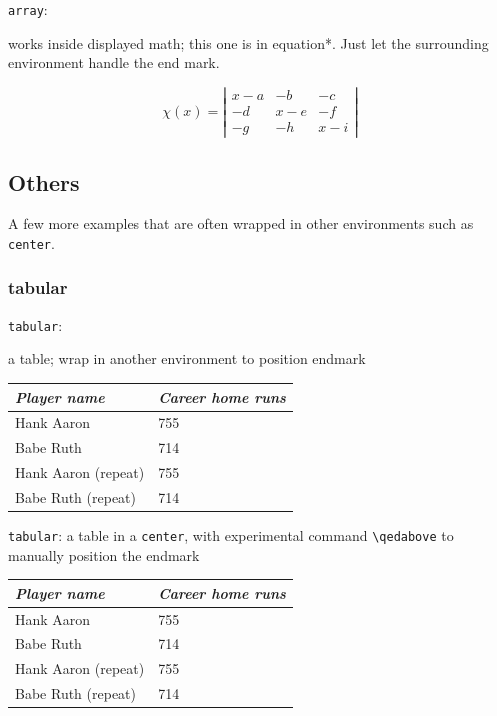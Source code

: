\documentclass[leqno]{article}
\newcommand{\testtype}[2]{\texttt{#1}:%
  #2}
\newcommand{\makeoutertest}[3]{
  \begin{test}
    \testtype{#1}{#2}
    #3
  \end{test}
}
\begin{document}
\makeoutertest{array}{
  works inside displayed math; this one is in equation*.
  Just let the surrounding environment handle the end mark.
}{
\begin{equation*}
  \chi(x) =
  \left|              %
    \begin{array}{ccc}
      x-a  &-b  &-c  \\
      -d   &x-e &-f  \\
      -g   &-h  &x-i
    \end{array}
 \right|
\end{equation*}
}






\subsection*{Others}

A few more examples that are often wrapped in other environments such as \texttt{center}.


\subsubsection*{tabular}

\makeoutertest{tabular}{
  a table; wrap in another environment to position endmark
}{
\begin{tabular}{l|l}
  \textit{Player name}  &\textit{Career home runs}  \\
  \hline
  Hank Aaron  &755 \\
  Babe Ruth   &714 \\
  Hank Aaron (repeat)  &755 \\
  Babe Ruth (repeat)  &714
\end{tabular}
}
\begin{test}
  \texttt{tabular}: 
  a table in a \texttt{center}, with experimental command \verb|\qedabove| to manually position the endmark
  \begin{center}
    \begin{tabular}{l|l}
      \textit{Player name}  &\textit{Career home runs}  \\
      \hline
      Hank Aaron  &755 \\
      Babe Ruth   &714 \\
      Hank Aaron (repeat)  &755 \\
      Babe Ruth (repeat)  &714
    \end{tabular}
  \end{center}\qedabove[1.3]
\end{test}
\end{document}
